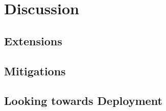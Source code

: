 \section{Discussion}

\subsection{Extensions}

\subsection{Mitigations}

\subsection{Looking towards Deployment}